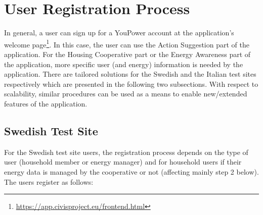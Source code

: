 \section{User Registration Process}
\label{sec:reg}

In general, a user can sign up for a YouPower account at the application's welcome page\footnote{\url{https://app.civisproject.eu/frontend.html}}. In this case, the user can use the Action Suggestion part of the application. For the Housing Cooperative part or the Energy Awareness part of the application, more specific user (and energy) information is needed by the application. There are tailored solutions for the Swedish and the Italian test sites respectively which are presented in the following two subsections. With respect to scalability, similar procedures can be used as a means to enable new/extended features of the application. 

\subsection{Swedish Test Site}

For the Swedish test site users, the registration process depends on the type of user (household member or energy manager) and for household users if their energy data is managed by the cooperative or not (affecting mainly step 2 below). The users register as follows:

